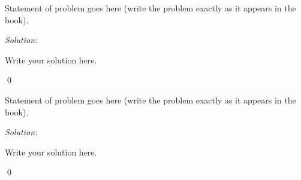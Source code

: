 \documentclass[12pt]{article}
\newenvironment{problem}[2][Problem]{\begin{trivlist}
\item[\hskip \labelsep {\bfseries #1}\hskip \labelsep {\bfseries #2.}]}{\end{trivlist}}
\newenvironment{sol}
    {\emph{Solution:}
    }
    {
    \qed
    }
\begin{document}




\begin{problem}{x.y.z} 
Statement of problem goes here (write the problem exactly as it appears in the book).
\end{problem}
\begin{sol}
Write your solution here.
\end{sol}



\begin{problem}{x.y.z}
Statement of problem goes here (write the problem exactly as it appears in the book).
\end{problem}
\begin{sol}
Write your solution here.
\end{sol}





\end{document}
